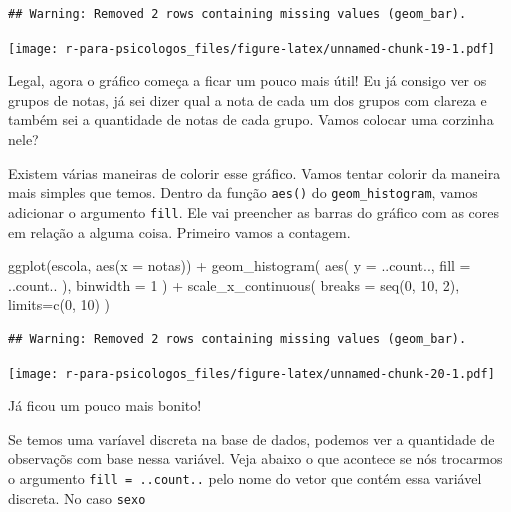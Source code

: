 \documentclass[
]{book}
\newenvironment{Shaded}{\begin{snugshade}}{\end{snugshade}}
\newcommand{\AttributeTok}[1]{\textcolor[rgb]{0.77,0.63,0.00}{#1}}
\newcommand{\DecValTok}[1]{\textcolor[rgb]{0.00,0.00,0.81}{#1}}
\newcommand{\FunctionTok}[1]{\textcolor[rgb]{0.00,0.00,0.00}{#1}}
\newcommand{\NormalTok}[1]{#1}
\newcommand{\SpecialCharTok}[1]{\textcolor[rgb]{0.00,0.00,0.00}{#1}}
\begin{document}
\begin{verbatim}
## Warning: Removed 2 rows containing missing values (geom_bar).
\end{verbatim}

\texttt{[image: r-para-psicologos\_files/figure-latex/unnamed-chunk-19-1.pdf]}

Legal, agora o gráfico começa a ficar um pouco mais útil! Eu já consigo ver os grupos de notas, já sei dizer qual a nota de cada um dos grupos com clareza e também sei a quantidade de notas de cada grupo. Vamos colocar uma corzinha nele?

Existem várias maneiras de colorir esse gráfico. Vamos tentar colorir da maneira mais simples que temos. Dentro da função \texttt{aes()} do \texttt{geom\_histogram}, vamos adicionar o argumento \texttt{fill}. Ele vai preencher as barras do gráfico com as cores em relação a alguma coisa. Primeiro vamos a contagem.

\begin{Shaded}
\begin{Highlighting}[]
\FunctionTok{ggplot}\NormalTok{(escola, }\FunctionTok{aes}\NormalTok{(}\AttributeTok{x =}\NormalTok{ notas)) }\SpecialCharTok{+} 
  \FunctionTok{geom\_histogram}\NormalTok{(}
    \FunctionTok{aes}\NormalTok{(}
      \AttributeTok{y =}\NormalTok{ ..count..,}
      \AttributeTok{fill =}\NormalTok{ ..count..}
\NormalTok{      ),}
    \AttributeTok{binwidth =} \DecValTok{1}
\NormalTok{  ) }\SpecialCharTok{+}
  \FunctionTok{scale\_x\_continuous}\NormalTok{(}
    \AttributeTok{breaks =} \FunctionTok{seq}\NormalTok{(}\DecValTok{0}\NormalTok{, }\DecValTok{10}\NormalTok{, }\DecValTok{2}\NormalTok{),}
    \AttributeTok{limits=}\FunctionTok{c}\NormalTok{(}\DecValTok{0}\NormalTok{, }\DecValTok{10}\NormalTok{)}
\NormalTok{  )}
\end{Highlighting}
\end{Shaded}

\begin{verbatim}
## Warning: Removed 2 rows containing missing values (geom_bar).
\end{verbatim}

\texttt{[image: r-para-psicologos\_files/figure-latex/unnamed-chunk-20-1.pdf]}

Já ficou um pouco mais bonito!

Se temos uma varíavel discreta na base de dados, podemos ver a quantidade de observaçõs com base nessa variável. Veja abaixo o que acontece se nós trocarmos o argumento \texttt{fill\ =\ ..count..} pelo nome do vetor que contém essa variável discreta. No caso \texttt{sexo}
\end{document}
